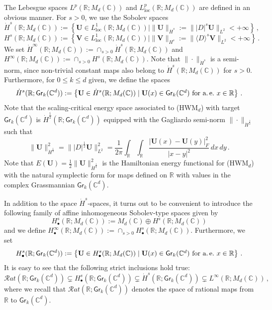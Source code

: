 \documentclass[11pt,reqno]{amsart}
\theoremstyle{definition}
\theoremstyle{remark}
\theoremstyle{remark}
\numberwithin{equation}{section}
\newcommand{\C}{\mathbb{C}}
\newcommand{\R}{\mathbb{R}}
\newcommand{\be}{\begin{equation}}
\newcommand{\ee}{\end{equation}}
\newcommand{\Vb}{\mathbf{V}}
\newcommand{\Ub}{\mathbf{U}}
\newcommand{\Gr}{\mathsf{Gr}}
\begin{document}
The Lebesgue spaces $L^p(\R; M_d(\C))$ and $L^p_{\mathrm{loc}}(\R; M_d(\C))$ are defined in an obvious manner. For $s > 0$, we use the Sobolev spaces
$$
\dot{H}^s(\R; M_d(\C)) := \left \{ \Ub \in L^1_{\mathrm{loc}}(\R; M_d(\C)) \mid \| \Ub \|_{\dot{H}^s} := \| |D|^s \Ub \|_{L^2} < +\infty \right \} \, , 
$$
$$
H^s(\R; M_d(\C)) := \left \{ \Vb \in L^1_{\mathrm{loc}}(\R; M_d(\C)) \mid \| \Vb \|_{H^s} := \| \langle D \rangle^s \Vb \|_{L^2} < +\infty \right \} \, .
$$
We set $\dot{H}^\infty(\R; M_d(\C)) := \cap_{s > 0} \dot{H}^s(\R; M_d(\C))$ and $H^\infty(\R; M_d(\C)) := \cap_{s >0} H^s(\R; M_d(\C))$. Note that $\| \cdot \|_{\dot{H}^s}$ is a semi-norm, since non-trivial constant maps also belong to $\dot{H}^s(\R; M_d(\C))$ for $s>0$. Furthermore, for $0 \leq k \leq d$ given, we define the spaces
$$
\dot{H}^s(\R; \Gr_k(\C^d)) := \left \{ \Ub \in \dot{H}^s(\R; M_d(\C)) \mid \mbox{$\Ub(x) \in \Gr_k(\C^d)$ for a.\,e.~$x \in \R$} \right \} \, .
$$
Note that the scaling-critical energy space associated to (HWM$_d$) with target $\Gr_k(\C^d)$ is $\dot{H}^{\frac 1 2}(\R; \Gr_k(\C^d))$ equipped with the Gagliardo semi-norm $\| \cdot \|_{\dot{H}^{\frac 1 2}}$ such that
\be \label{eq:H_half}
\| \Ub \|_{\dot{H}^{\frac 1 2}}^2 = \| |D|^{\frac 1 2} \Ub \|_{L^2}^2 = \frac{1}{2 \pi} \int_{\R} \! \int_{\R} \frac{|\Ub(x)- \Ub(y)|_F^2}{|x-y|^2} \, dx \, dy \, .
\ee
Note that $E(\Ub) = \frac{1}{2} \| \Ub \|_{\dot{H}^{\frac 1 2}}^2$ is the Hamiltonian energy functional for (HWM$_d$) with the natural symplectic form for maps defined on $\R$ with values in the complex Grassmannian $\Gr_k(\C^d)$.

\medskip
In addition to the space $\dot{H}^s$-spaces, it turns out to be convenient to introduce the following family of affine inhomogeneous Sobolev-type spaces given by
$$
H^s_\bullet(\R; M_d(\C)) := M_d(\C) \oplus H^s(\R; M_d(\C)) 
$$
and we define $H^\infty_\bullet(\R; M_d(\C)) := \cap_{s > 0} H^s_\bullet(\R;M_d(\C))$. Furthermore, we set
$$
H^s_\bullet(\R; \Gr_k(\C^d)) := \left \{ \Ub\in H^s_\bullet(\R; M_d(\C)) \mid \mbox{$\Ub(x) \in \Gr_k(\C^d)$ for a.\,e.~$x\in \R$} \right \}  \, .
$$
It is easy to see that the following strict inclusions hold true:
$$
\mathcal{R}at(\R; \Gr_k(\C^d)) \subsetneq H^s_\bullet(\R; \Gr_k(\C^d)) \subsetneq  \dot{H}^s(\R; \Gr_k(\C^d)) \subsetneq L^\infty(\R; M_d(\C)) \, ,
$$
where we recall that $\mathcal{R}at(\R; \Gr_k(\C^d))$ denotes the space of rational maps from $\R$ to $\Gr_k(\C^d)$.
\end{document}
